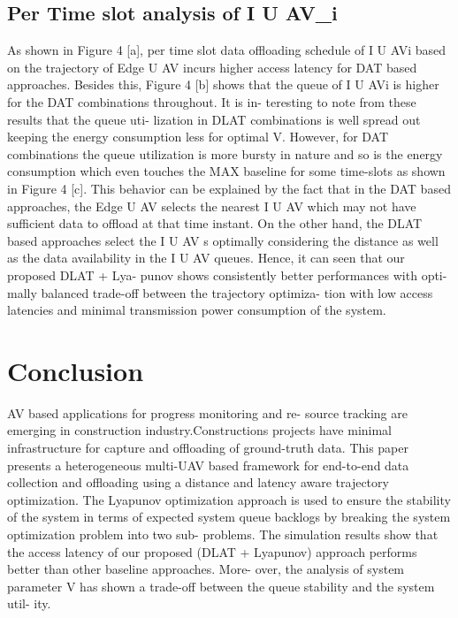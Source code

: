 \documentclass{article}
\begin{document}
\begin{multicols}{2}
\subsection{Per Time slot analysis of I U AV_i}
As shown in Figure 4 [a], per time slot data offloading
schedule of I U AVi based on the trajectory of Edge U AV
incurs higher access latency for DAT based approaches.
Besides this, Figure 4 [b] shows that the queue of I U AVi
is higher for the DAT combinations throughout. It is in-
teresting to note from these results that the queue uti-
lization in DLAT combinations is well spread out keeping
the energy consumption less for optimal V. However, for
DAT combinations the queue utilization is more bursty
in nature and so is the energy consumption which even
touches the MAX baseline for some time-slots as shown
in Figure 4 [c]. This behavior can be explained by the
fact that in the DAT based approaches, the Edge U AV
selects the nearest I U AV which may not have sufficient
data to offload at that time instant. On the other hand,
the DLAT based approaches select the I U AV s optimally
considering the distance as well as the data availability in
the I U AV queues.
Hence, it can seen that our proposed DLAT + Lya-
punov shows consistently better performances with opti-
mally balanced trade-off between the trajectory optimiza-
tion with low access latencies and minimal transmission
power consumption of the system.

\section{Conclusion}
AV based applications for progress monitoring and re-
source tracking are emerging in construction industry.Constructions projects have minimal infrastructure for
capture and offloading of ground-truth data. This paper
presents a heterogeneous multi-UAV based framework for
end-to-end data collection and offloading using a distance
and latency aware trajectory optimization. The Lyapunov
optimization approach is used to ensure the stability of
the system in terms of expected system queue backlogs by
breaking the system optimization problem into two sub-
problems. The simulation results show that the access
latency of our proposed (DLAT + Lyapunov) approach
performs better than other baseline approaches. More-
over, the analysis of system parameter V has shown a
trade-off between the queue stability and the system util-
ity.



\end{multicols}
\end{document}
